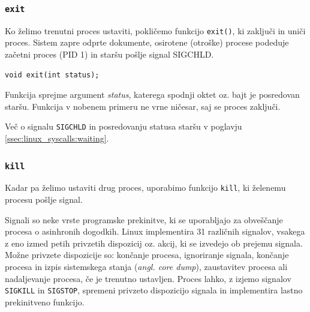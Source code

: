 \documentclass[a4paper,12pt,openright]{book}
\begin{document}
\subsubsection{\texttt{exit}}

Ko želimo trenutni proces ustaviti, pokličemo funkcijo \texttt{exit()}, ki zaključi in uniči proces.
Sistem zapre odprte dokumente, osirotene (otroške) procese podeduje začetni proces (PID 1) in staršu pošlje signal SIGCHLD.

\begin{lstlisting}[style=func]
 void exit(int status);
\end{lstlisting}

Funkcija sprejme argument \textit{status}, katerega spodnji oktet oz. bajt je posredovan staršu.
Funkcija v nobenem primeru ne vrne ničesar, saj se proces zaključi.

Več o signalu \texttt{SIGCHLD} in posredovanju statusa staršu v poglavju \ref{ssec:linux_syscalls:waiting}.

\subsubsection{\texttt{kill}}

Kadar pa želimo ustaviti drug proces, uporabimo funkcijo \texttt{kill}, ki želenemu procesu pošlje signal.

Signali so neke vrste programske prekinitve, ki se uporabljajo za obveščanje procesa o asinhronih dogodkih. %
Linux implementira 31 različnih signalov, vsakega z eno izmed petih privzetih dispozicij oz. akcij, ki se izvedejo ob prejemu signala.
Možne privzete dispozicije so: končanje procesa, ignoriranje signala, končanje procesa in izpis sistemskega stanja (\textit{angl. core dump}), zaustavitev procesa ali nadaljevanje procesa, če je trenutno ustavljen.
Proces lahko, z izjemo signalov \texttt{SIGKILL} in \texttt{SIGSTOP}, spremeni privzeto dispozicijo signala in implementira lastno prekinitveno funkcijo.
\end{document}
